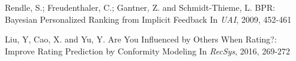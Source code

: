 \documentclass[sigconf]{acmart}
\begin{document}
\begin{thebibliography}{10}
 Rendle, S.; Freudenthaler, C.; Gantner, Z. and Schmidt-Thieme, L. 
 \newblock BPR: Bayesian Personalized Ranking from Implicit Feedback 
 \newblock In {\em UAI}, 2009, 452-461
 
Liu, Y, Cao, X. and Yu, Y. 
\newblock Are You Influenced by Others When Rating?: Improve Rating Prediction by Conformity Modeling 
\newblock In {\em RecSys}, 2016, 269-272

\end{thebibliography}

\end{document}
